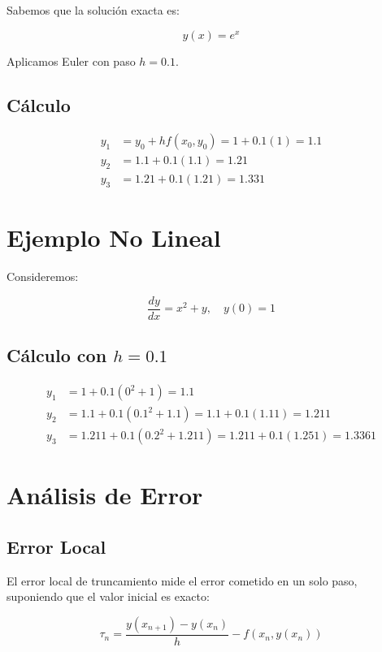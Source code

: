 \documentclass[12pt,a4paper]{article}
\begin{document}
Sabemos que la solución exacta es:

\begin{equation}
y(x) = e^x
\end{equation}

Aplicamos Euler con paso $h = 0.1$.

\subsection*{Cálculo}

\begin{align*}
y_1 &= y_0 + h f(x_0, y_0) = 1 + 0.1(1) = 1.1 \\
y_2 &= 1.1 + 0.1(1.1) = 1.21 \\
y_3 &= 1.21 + 0.1(1.21) = 1.331
\end{align*}

\section{Ejemplo No Lineal}

Consideremos:

\begin{equation}
\frac{dy}{dx} = x^2 + y, \quad y(0) = 1
\end{equation}

\subsection*{Cálculo con $h = 0.1$}

\begin{align*}
y_1 &= 1 + 0.1(0^2 + 1) = 1.1 \\
y_2 &= 1.1 + 0.1(0.1^2 + 1.1) = 1.1 + 0.1(1.11) = 1.211 \\
y_3 &= 1.211 + 0.1(0.2^2 + 1.211) = 1.211 + 0.1(1.251) = 1.3361
\end{align*}

\section{Análisis de Error}

\subsection{Error Local}

El error local de truncamiento mide el error cometido en un solo paso, suponiendo que el valor inicial es exacto:

\begin{equation}
\tau_n = \frac{y(x_{n+1}) - y(x_n)}{h} - f(x_n, y(x_n))
\end{equation}
\end{document}
